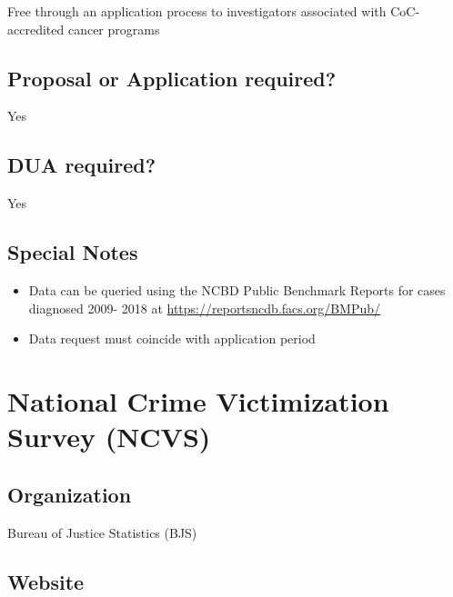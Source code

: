 \documentclass[
]{book}
\providecommand{\tightlist}{%
  \setlength{\itemsep}{0pt}\setlength{\parskip}{0pt}}
\begin{document}
Free through an application process to investigators associated with CoC-accredited cancer programs

\hypertarget{proposal-or-application-required-45}{%
\section{Proposal or Application required?}\label{proposal-or-application-required-45}}

Yes

\hypertarget{dua-required-45}{%
\section{DUA required?}\label{dua-required-45}}

Yes

\hypertarget{special-notes-45}{%
\section{Special Notes}\label{special-notes-45}}

\begin{itemize}
\tightlist
\item
  Data can be queried using the NCBD Public Benchmark Reports for cases diagnosed 2009- 2018 at \url{https://reportsncdb.facs.org/BMPub/}
\item
  Data request must coincide with application period
\end{itemize}

\mainmatter

\hypertarget{national-crime-victimization-survey-ncvs}{%
\chapter{National Crime Victimization Survey (NCVS)}\label{national-crime-victimization-survey-ncvs}}

\hypertarget{organization-46}{%
\section{Organization}\label{organization-46}}

Bureau of Justice Statistics (BJS)

\hypertarget{website-46}{%
\section{Website}\label{website-46}}
\end{document}
